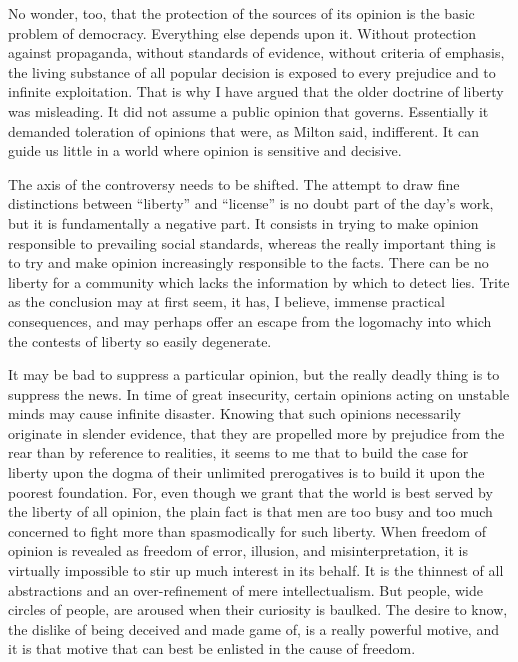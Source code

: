 \documentclass[openany,nobib,twoside,nohyper]{tufte-book}
\begin{document}
No wonder, too, that the protection of the sources of its opinion is the
basic problem of democracy. Everything else depends upon it. Without
protection against propaganda, without standards of evidence, without
criteria of emphasis, the living substance of all popular decision is
exposed to every prejudice and to infinite exploitation. That is why I
have argued that the older doctrine of liberty was misleading. It did
not assume a public opinion that governs. Essentially it demanded
toleration of opinions that were, as Milton said, indifferent. It can
guide us little in a world where opinion is sensitive and decisive.

The axis of the controversy needs to be shifted. The attempt to draw
fine distinctions between ``liberty'' and ``license'' is no doubt part
of the day's work, but it is fundamentally a negative part. It consists
in trying to make opinion responsible to prevailing social standards,
whereas the really important thing is to try and make opinion
increasingly responsible to the facts. There can be no liberty for a
community which lacks the information by which to detect lies. Trite as
the conclusion may at first seem, it has, I believe, immense practical
consequences, and may perhaps offer an escape from the logomachy into
which the contests of liberty so easily degenerate.

It may be bad to suppress a particular opinion, but the really deadly
thing is to suppress the news. In time of great insecurity, certain
opinions acting on unstable minds may cause infinite disaster. Knowing
that such opinions necessarily originate in slender evidence, that they
are propelled more by prejudice from the rear than by reference to
realities, it seems to me that to build the case for liberty upon the
dogma of their unlimited prerogatives is to build it upon the poorest
foundation. For, even though we grant that the world is best served by
the liberty of all opinion, the plain fact is that men are too busy and
too much concerned to fight more than spasmodically for such liberty.
When freedom of opinion is revealed as freedom of error, illusion, and
misinterpretation, it is virtually impossible to stir up much interest
in its behalf. It is the thinnest of all abstractions and an
over-refinement of mere intellectualism. But people, wide circles of
people, are aroused when their curiosity is baulked. The desire to know,
the dislike of being deceived and made game of, is a really powerful
motive, and it is that motive that can best be enlisted in the cause of
freedom.
\end{document}
